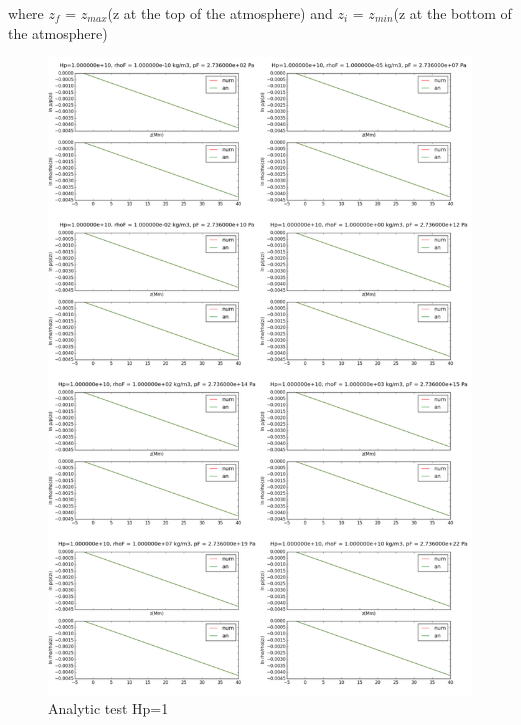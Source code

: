 \documentclass[10pt]{book}
\begin{document}
where $z_f$ = $z_{max}$(z at the top of the atmosphere) and $z_i$ = $z_{min}$(z at the bottom of the atmosphere)


\begin{figure}[H]
 \centering
 \includegraphics[scale=0.5]{allanalytic.png}
 \caption{Analytic test Hp=1}
\end{figure}
\end{document}
